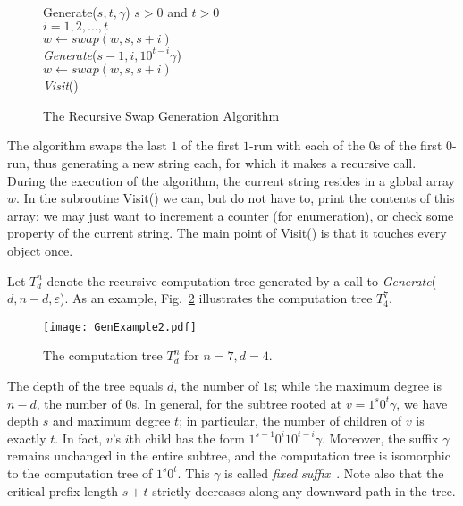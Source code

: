 \documentclass[11pt,a4paper]{llncs}
\def\swap{\textit{swap}}
\renewcommand{\epsilon}{\varepsilon}
\begin{document}
\begin{figure}
\begin{algorithm}{Generate($s,t,\gamma$)}{
} 
\qif $s>0$ and $t>0$ \\ \qthen 
\qfor $i=1,2,\ldots, t$\\
\qdo 
$w \gets \swap(w,s,s+i)$ \\
{\em Generate}($s-1,i,10^{t-i}\gamma$)\\
$w \gets \swap(w,s,s+i)$
\qend
\qfi \\
{\em Visit}()
\end{algorithm}
\vspace{-4mm}
\caption{The Recursive Swap Generation Algorithm\label{algo:bubble}}
\end{figure}



The algorithm swaps the last $1$ of the first $1$-run with each of the $0$s of the first $0$-run, thus generating a new string each, for which it makes a recursive call. During the execution of the algorithm, the current string resides in a global array $w$.  In the subroutine Visit() we can, but do not have to, print the contents of this array; we may just want to increment a counter (for enumeration), or check some property of the current string. The main point of Visit() is that it touches every object once. 


Let $T^n_d$ denote the recursive computation tree generated by a call to {\em Generate}($d,n-d,\epsilon$).
As an example,  Fig.~\ref{fig:example1} illustrates the computation tree $T^7_4$. 
\begin{figure}
\begin{center}
\texttt{[image: GenExample2.pdf]}
\caption{\label{fig:example1}The computation tree $T_d^n$ for $n=7,d=4$.}
\end{center}
\end{figure}

\noindent The depth of the tree equals $d$, the number of $1$s; while the maximum degree is $n-d$, the number of $0$s. In general, for the subtree rooted at $v = 1^s0^t\gamma$, we have depth $s$ and maximum degree $t$; in particular, the number of children of $v$ is exactly $t$. In fact, $v$'s $i$th child has the form $1^{s-1}0^i10^{t-i}\gamma$. Moreover, the suffix $\gamma$ remains unchanged in the entire subtree, and the computation tree is isomorphic to the computation tree of $1^s0^t$. This $\gamma$ is called {\em fixed suffix}~\cite{RSW12}. Note also that the critical prefix length $s+t$ strictly decreases along any downward path in the tree. 
\end{document}
